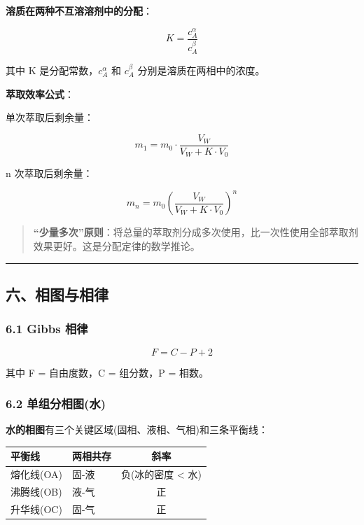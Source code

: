 \documentclass[a4paper,11pt]{ctexart}
\newcounter{none}
\newcommand{\箭}{\ensuremath{\rightarrow}}
\newcommand{\左箭}{\ensuremath{\leftarrow}}
\newcommand{\上箭}{\ensuremath{\uparrow}}
\newcommand{\下箭}{\ensuremath{\downarrow}}
\newcommand{\衡}{\ensuremath{\rightleftharpoons}}
\newcommand{\双箭}{\ensuremath{\leftrightarrow}}
\newcommand{\约等于}{\ensuremath{\approx}}
\newcommand{\小于等于}{\ensuremath{\leq}}
\newcommand{\大于等于}{\ensuremath{\geq}}
\newcommand{\不等于}{\ensuremath{\neq}}
\newcommand{\西格马}{\ensuremath{\sigma}}
\newcommand{\派}{\ensuremath{\pi}}
\begin{document}
\textbf{溶质在两种不互溶溶剂中的分配}：

\[
\boxed{K = \frac{c_A^\alpha}{c_A^\beta}}
\]

其中 K 是分配常数，\(c_A^\alpha\) 和 \(c_A^\beta\) 分别是溶质在两相中的浓度。

\textbf{萃取效率公式}：

单次萃取后剩余量：

\[
m_1 = m_0 \cdot \frac{V_W}{V_W + K \cdot V_0}
\]

n 次萃取后剩余量：

\[
m_n = m_0 \left(\frac{V_W}{V_W + K \cdot V_0}\right)^n
\]

\begin{quote}
\textbf{``少量多次''原则}：将总量的萃取剂分成多次使用，比一次性使用全部萃取剂效果更好。这是分配定律的数学推论。
\end{quote}

\begin{center}\rule{0.5\linewidth}{0.5pt}\end{center}

\subsection{六、相图与相律}\label{ux516dux76f8ux56feux4e0eux76f8ux5f8b}

\subsubsection{6.1 Gibbs 相律}\label{gibbs-ux76f8ux5f8b}

\[
\boxed{F = C - P + 2}
\]

其中 F = 自由度数，C = 组分数，P = 相数。

\subsubsection{6.2 单组分相图(水)}\label{ux5355ux7ec4ux5206ux76f8ux56feux6c34}

\textbf{水的相图}有三个关键区域(固相、液相、气相)和三条平衡线：

{\def\LTcaptype{none} %
\begin{longtable}[]{@{}llc@{}}
\toprule\noalign{}
平衡线 & 两相共存 & 斜率 \\
\midrule\noalign{}
\endhead
\bottomrule\noalign{}
\endlastfoot
熔化线(OA) & 固-液 & 负(冰的密度 \textless{} 水) \\
沸腾线(OB) & 液-气 & 正 \\
升华线(OC) & 固-气 & 正 \\
\end{longtable}
}
\end{document}
